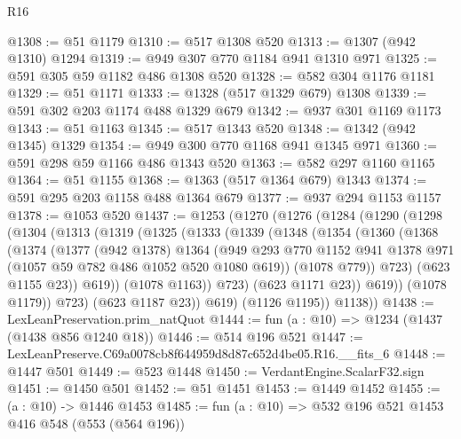 \begin{lexlean}{R16}
\begin{coremodule}
@1308 := @51 @1179
@1310 := @517 @1308 @520
@1313 := @1307 (@942 @1310) @1294
@1319 := @949 @307 @770 @1184 @941 @1310 @971
@1325 := @591 @305 @59 @1182 @486 @1308 @520
@1328 := @582 @304 @1176 @1181
@1329 := @51 @1171
@1333 := @1328 (@517 @1329 @679) @1308
@1339 := @591 @302 @203 @1174 @488 @1329 @679
@1342 := @937 @301 @1169 @1173
@1343 := @51 @1163
@1345 := @517 @1343 @520
@1348 := @1342 (@942 @1345) @1329
@1354 := @949 @300 @770 @1168 @941 @1345 @971
@1360 := @591 @298 @59 @1166 @486 @1343 @520
@1363 := @582 @297 @1160 @1165
@1364 := @51 @1155
@1368 := @1363 (@517 @1364 @679) @1343
@1374 := @591 @295 @203 @1158 @488 @1364 @679
@1377 := @937 @294 @1153 @1157
@1378 := @1053 @520
@1437 := @1253
    (@1270
      (@1276
        (@1284
          (@1290
            (@1298
              (@1304
                (@1313
                  (@1319
                    (@1325
                      (@1333
                        (@1339
                          (@1348
                            (@1354
                              (@1360
                                (@1368
                                  (@1374
                                    (@1377
                                      (@942 @1378)
                                      @1364
                                      (@949
                                        @293
                                        @770
                                        @1152
                                        @941
                                        @1378
                                        @971
                                        (@1057 @59 @782 @486 @1052 @520 @1080 @619))
                                      (@1078 @779))
                                    @723)
                                  (@623 @1155 @23))
                                @619))
                            (@1078 @1163))
                          @723)
                        (@623 @1171 @23))
                      @619))
                  (@1078 @1179))
                @723)
              (@623 @1187 @23))
            @619)
          (@1126 @1195))
        @1138))
@1438 := LexLeanPreservation.prim_natQuot
@1444 := fun (a : @10) => @1234 (@1437 (@1438 @856 @1240 @18))
@1446 := @514 @196 @521
@1447 := LexLeanPreserve.C69a0078cb8f644959d8d87c652d4be05.R16.__fits_6
@1448 := @1447 @501
@1449 := @523 @1448
@1450 := VerdantEngine.ScalarF32.sign
@1451 := @1450 @501
@1452 := @51 @1451
@1453 := @1449 @1452
@1455 := (a : @10) -> @1446 @1453
@1485 := fun (a : @10) =>
  @532
    @196
    @521
    @1453
    @416
    @548
    (@553 (@564 @196))

\end{coremodule}
\end{lexlean}
